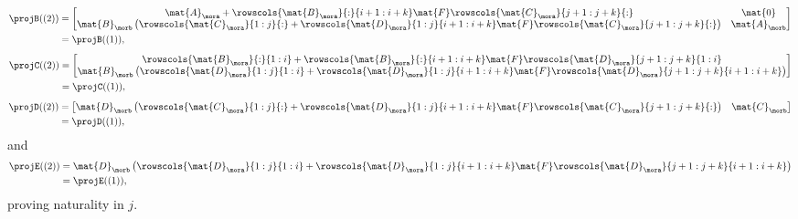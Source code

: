 {\begin{example}
\begin{equation*}
            \begin{aligned}
                \projB((2)) & =\begin{bmatrix}
                                   \mat{A}_\mora + \rowscols{\mat{B}_\mora}{:}{i+1:i+k}\mat{F}\rowscols{\mat{C}_\mora}{j+1:j+k}{:}                                                   & \mat{0}       \\
                                   \mat{B}_\morb \left( \rowscols{\mat{C}_\mora}{1:j}{:}+ \rowscols{\mat{D}_\mora}{1:j}{i+1:i+k} \mat{F} \rowscols{\mat{C}_\mora}{j+1:j+k}{:}\right) & \mat{A}_\morb
                               \end{bmatrix} \\
                            & =\projB((1)),
            \end{aligned}
        \end{equation*}
        \begin{equation*}
            \begin{aligned}
                \projC((2)) & =\begin{bmatrix} \rowscols{\mat{B}_\mora}{:}{1:i}+\rowscols{\mat{B}_\mora}{:}{i+1:i+k}\mat{F}\rowscols{\mat{D}_\mora}{j+1:j+k}{1:i} \\ \mat{B}_\morb \left( \rowscols{\mat{D}_\mora}{1:j}{1:i}+ \rowscols{\mat{D}_\mora}{1:j}{i+1:i+k}\mat{F}\rowscols{\mat{D}_\mora}{j+1:j+k}{i+1:i+k}\right)\end{bmatrix} \\
                            & =\projC((1)),
            \end{aligned}
        \end{equation*}
        \begin{equation*}
            \begin{aligned}
                \projD((2)) & =\begin{bmatrix}\mat{D}_\morb \left(\rowscols{\mat{C}_\mora}{1:j}{:}+ \rowscols{\mat{D}_\mora}{1:j}{i+1:i+k} \mat{F} \rowscols{\mat{C}_\mora}{j+1:j+k}{:}\right)&\mat{C}_\morb \end{bmatrix} \\
                            & =\projD((1)),
            \end{aligned}
        \end{equation*}
        and
        \begin{equation*}
            \begin{aligned}
                \projE((2)) & =\mat{D}_\morb\left(\rowscols{\mat{D}_\mora}{1:j}{1:i}+ \rowscols{\mat{D}_\mora}{1:j}{i+1:i+k}\mat{F}\rowscols{\mat{D}_\mora}{j+1:j+k}{i+1:i+k} \right) \\
                            & =\projE((1)),
            \end{aligned}
        \end{equation*}
        proving naturality in $j$.

\end{example}}
